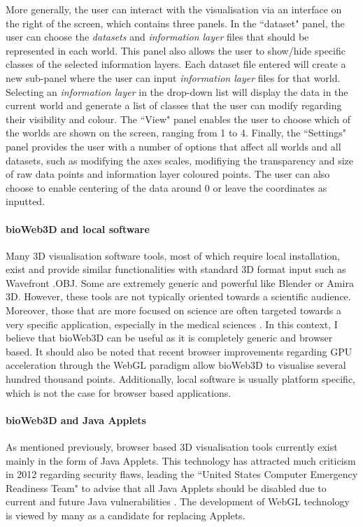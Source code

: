 	More generally, the user can interact with the visualisation via an interface on the right of the screen, which contains three panels. In the ``dataset" panel, the user can choose the {\it{datasets}} and {\it{information layer}} files that should be represented in each world. This panel also allows the user to show/hide specific classes of the selected information layers. Each dataset file entered will create a new sub-panel where the user can input {\it{information layer}} files for that world. Selecting an {\it{information layer}} in the drop-down list will display the data in the current world and generate a list of classes that the user can modify regarding their visibility and colour. The ``View" panel enables the user to choose which of the worlds are shown on the screen, ranging from 1 to 4. Finally, the ``Settings" panel provides the user with a number of options that affect all worlds and all datasets, such as modifying the axes scales, modifiying the transparency and size of raw data points and information layer coloured points. The user can also choose to enable centering of the data around 0 or leave the coordinates as inputted.

		\paragraph{bioWeb3D and local software}
Many 3D visualisation software tools, most of which require local installation, exist and provide similar functionalities with standard 3D format input such as Wavefront .OBJ. Some are extremely generic and powerful like Blender or Amira 3D. However, these tools are not typically oriented towards a scientific audience. Moreover, those that are more focused on science are often targeted towards a very specific application, especially in the medical sciences \cite{Wang093D}. In this context, I believe that bioWeb3D can be useful as it is completely generic and browser based. It should also be noted that recent browser improvements regarding GPU acceleration through the WebGL paradigm allow bioWeb3D to visualise several hundred thousand points. Additionally, local software is usually platform specific, which is not the case for browser based applications.

		\paragraph{bioWeb3D and Java Applets}
As mentioned previously, browser based 3D visualisation tools currently exist mainly in the form of Java Applets. This technology has attracted much criticism in 2012 regarding security flaws, leading the ``United States Computer Emergency Readiness Team" to advise that all Java Applets should be disabled due to current and future Java vulnerabilities \cite{security}. The development of WebGL technology is viewed by many as a candidate for replacing Applets. 



